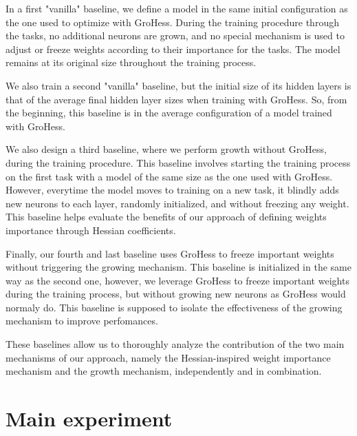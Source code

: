 \documentclass[11pt]{article}
\begin{document}
\vspace{2mm}
\noindent
In a first "vanilla" baseline, we define a model in the same initial configuration as the one used to optimize with GroHess. During the training procedure through the tasks, no additional neurons are grown, and no special mechanism is used to adjust or freeze weights according to their importance for the tasks. The model remains at its original size throughout the training process.

\vspace{2mm}
\noindent
We also train a second "vanilla" baseline, but the initial size of its hidden layers is that of the average final hidden layer sizes when training with GroHess. So, from the beginning, this baseline is in the average configuration of a model trained with GroHess. 

\vspace{2mm}
\noindent
We also design a third baseline, where we perform growth without GroHess, during the training procedure. This baseline involves starting the training process on the first task with a model of the same size as the one used with GroHess. However, everytime the model moves to training on a new task, it blindly adds new neurons to each layer, randomly initialized, and without freezing any weight. This baseline helps evaluate the benefits of our approach of defining weights importance through Hessian coefficients. 

\vspace{2mm}
\noindent
Finally, our fourth and last baseline uses GroHess to freeze important weights without triggering the growing mechanism. This baseline is initialized in the same way as the second one, however, we leverage GroHess to freeze important weights during the training process, but without growing new neurons as GroHess would normaly do. This baseline is supposed to isolate the effectiveness of the growing mechanism to improve perfomances.

\vspace{2mm}
\noindent
These baselines allow us to thoroughly analyze the contribution of the two main mechanisms of our approach, namely the Hessian-inspired weight importance mechanism and the growth mechanism, independently and in combination.



\section{Main experiment}
\end{document}
